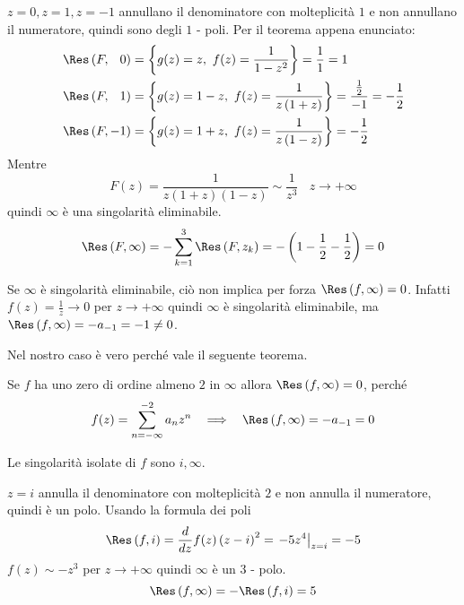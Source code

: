 $z = 0, z = 1, z = -1$ annullano il denominatore con molteplicità $1$ e non annullano il numeratore, quindi sono degli $1$ - poli. Per il teorema appena enunciato:
\begin{align*}
\Res \left(F, \phantom{-}0\right) & = \left\{g(z) = z, \ f(z) = \frac{1}{1 - z^{2}}\right\} = \frac{1}{1} = 1\\
\Res \left(F, \phantom{-}1\right) & = \left\{g(z) = 1 - z, \ f(z) = \frac{1}{z\left(1 + z\right)}\right\} = \frac{\frac{1}{2}}{- 1} = - \frac{1}{2}\\
\Res \left(F, - 1\right) 			 & = \left\{g(z) = 1 + z, \ f(z) = \frac{1}{z\left(1 - z\right)}\right\} = - \frac{1}{2}
\end{align*}
Mentre
\begin{equation*}
F(z) = \frac{1}{z\left(1 + z\right)\left(1 - z\right)} \sim \frac{1}{z^{3}} \ \ \ \ z\rightarrow + \infty
\end{equation*}
quindi $\infty $ è una singolarità eliminabile.
\begin{equation*}
\Res \left(F, \infty \right) = - \sum\limits^{3}_{k = 1}\Res \left(F, z_{k}\right) = - \left(1 - \frac{1}{2} - \frac{1}{2}\right) = 0
\end{equation*}
\begin{rem}
Se $\infty $ è singolarità eliminabile, ciò non implica per forza $\Res \left(f, \infty \right) = 0$. Infatti $f(z) = \frac{1}{z}\rightarrow 0$ per $z\rightarrow + \infty $ quindi $\infty $ è singolarità eliminabile, ma $\Res \left(f, \infty \right) = - a_{- 1} = - 1\neq 0$.
\end{rem}
\begin{rem}
Nel nostro caso è vero perché vale il seguente teorema.
\end{rem}
\begin{thm}
Se $f$ ha uno zero di ordine almeno $2$ in $\infty $ allora $\Res \left(f, \infty \right) = 0$, perché
\begin{equation*}
f(z) = \sum\limits^{- 2}_{n = -\infty} a_{n} z^{n} \ \ \implies \ \ \Res \left(f, \infty \right) = - a_{- 1} = 0
\end{equation*}
\end{thm}

\Soluzione

Le singolarità isolate di $f$ sono $i, \infty $.

$z = i$ annulla il denominatore con molteplicità $2$ e non annulla il numeratore, quindi è un polo. Usando la formula dei poli
\begin{equation*}
\Res \left(f, i\right) = \frac{d}{dz} f(z)\left(z - i\right)^{2} = \left. - 5z^{4}\right|_{z = i} = - 5
\end{equation*}
$f(z) \sim - z^{3}$ per $z\rightarrow + \infty $ quindi $\infty $ è un $3$ - polo.
\begin{equation*}
\Res \left(f, \infty \right) = - \Res \left(f, i\right) = 5
\end{equation*}

